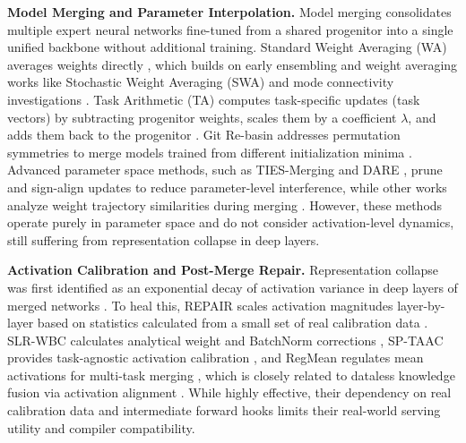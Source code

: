 \documentclass{article}
\theoremstyle{plain}
\theoremstyle{definition}
\theoremstyle{remark}
\begin{document}
\textbf{Model Merging and Parameter Interpolation.} Model merging consolidates multiple expert neural networks fine-tuned from a shared progenitor into a single unified backbone without additional training. Standard Weight Averaging (WA) averages weights directly \cite{Wortsman2022}, which builds on early ensembling and weight averaging works like Stochastic Weight Averaging (SWA) \cite{Izmailov2018} and mode connectivity investigations \cite{Garipov2018}. Task Arithmetic (TA) computes task-specific updates (task vectors) by subtracting progenitor weights, scales them by a coefficient $\lambda$, and adds them back to the progenitor \cite{Ilharco2023}. Git Re-basin addresses permutation symmetries to merge models trained from different initialization minima \cite{Ainsworth2023}. Advanced parameter space methods, such as TIES-Merging \cite{Yadav2023} and DARE \cite{Yu2023}, prune and sign-align updates to reduce parameter-level interference, while other works analyze weight trajectory similarities during merging \cite{Mucke2023}. However, these methods operate purely in parameter space and do not consider activation-level dynamics, still suffering from representation collapse in deep layers.

\textbf{Activation Calibration and Post-Merge Repair.} Representation collapse was first identified as an exponential decay of activation variance in deep layers of merged networks \cite{Jordan2023}. To heal this, REPAIR scales activation magnitudes layer-by-layer based on statistics calculated from a small set of real calibration data \cite{Jordan2023}. SLR-WBC calculates analytical weight and BatchNorm corrections \cite{Yadav2024}, SP-TAAC provides task-agnostic activation calibration \cite{Patil2024}, and RegMean regulates mean activations for multi-task merging \cite{Jin2023a}, which is closely related to dataless knowledge fusion via activation alignment \cite{Jin2023b}. While highly effective, their dependency on real calibration data and intermediate forward hooks limits their real-world serving utility and compiler compatibility.
\end{document}
